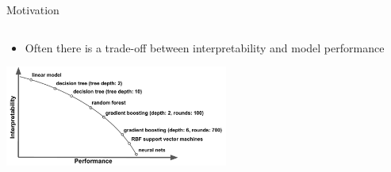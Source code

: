 \documentclass[11pt,compress,t,notes=noshow, aspectratio=169, xcolor=table]{beamer}
\begin{document}
\begin{frame}{Motivation}
\begin{columns}[T, totalwidth = \textwidth]
\begin{column}{0.42\textwidth}
    \end{column}
\end{columns}

\begin{itemize}
 \item Often there is a trade-off between interpretability and model performance 
\end{itemize}
\centering
\includegraphics[width=0.55\textwidth]{figure/performance_vs_interpretability.pdf}
\end{frame}
\end{document}
